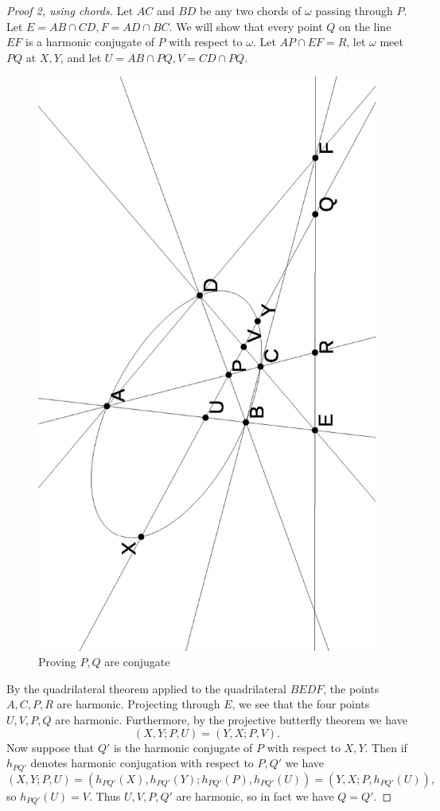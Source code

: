 \begin{proof}[Proof 2, using chords]
Let $AC$ and $BD$ be any two chords of $\omega$ passing through $P$. Let $E = AB\cap CD, F = AD\cap BC$. We will show that every point $Q$ on the line $EF$ is a harmonic conjugate of $P$ with respect to $\omega$. Let $AP\cap EF = R$, let $\omega$ meet $PQ$ at $X,Y$, and let $U = AB\cap PQ, V = CD\cap PQ$.

\begin{figure}[!htb]
\centering
\includegraphics[scale=0.5,angle=270]{polar.eps}
\caption{Proving $P,Q$ are conjugate}
\end{figure}

By the quadrilateral theorem applied to the quadrilateral $BEDF$, the points $A,C,P,R$ are harmonic. Projecting through $E$, we see that the four points $U,V,P,Q$ are harmonic. Furthermore, by the projective butterfly theorem we have
\[
(X,Y;P,U) = (Y,X;P,V).
\]
Now suppose that $Q'$ is the harmonic conjugate of $P$ with respect to $X,Y$. Then if $h_{PQ'}$ denotes harmonic conjugation with respect to $P,Q'$ we have
\[
(X,Y;P,U) = (h_{PQ'}(X),h_{PQ'}(Y);h_{PQ'}(P),h_{PQ'}(U)) = (Y,X;P,h_{PQ'}(U)),
\]
so $h_{PQ'}(U) = V$. Thus $U,V,P,Q'$ are harmonic, so in fact we have $Q=Q'$.
\end{proof}

